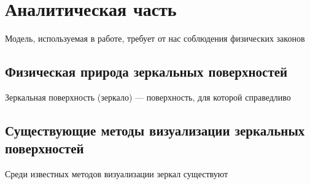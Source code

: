 \chapter{Аналитическая часть}

Модель, используемая в работе, требует от нас соблюдения физических законов

\section{Физическая природа зеркальных поверхностей}

Зеркальная поверхность (зеркало) --- поверхность, для которой справедливо \cite{rodionov,}

\section{Существующие методы визуализации зеркальных поверхностей}

Среди известных методов визуализации зеркал существуют 